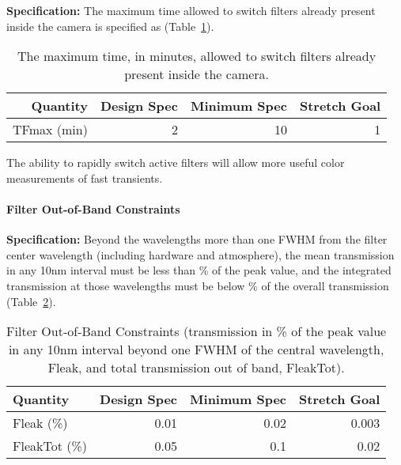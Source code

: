 \newpage
\textbf{Specification:} The maximum time allowed to switch filters already
present inside the camera is specified as
(Table~\ref{Tfilterswitch}).

\begin{table}[h]
\begin{tabular}{|r|r|r|r|}
\hline
     Quantity     & Design Spec & Minimum Spec  & Stretch Goal      \\
\hline
 TFmax (min)      &      2      &      10       &       1           \\
\hline
\end{tabular}
\caption{The maximum time, in minutes, allowed to switch filters already
present inside the camera.}
\label{Tfilterswitch}
\end{table}

The ability to rapidly switch active filters will allow more useful color
measurements of fast transients.


\paragraph{Filter Out-of-Band Constraints\\}

\textbf{Specification:} Beyond the wavelengths more than one FWHM from the filter
center wavelength (including hardware and atmosphere), the mean transmission
in any 10nm interval must be less than
\% of the peak value, and the integrated transmission at those wavelengths
must be below
\% of the overall transmission (Table~\ref{Tleaks}).

\begin{table}[h]
\begin{tabular}{|l|r|r|r|}
\hline
Quantity    & Design Spec & Minimum Spec & Stretch Goal        \\
\hline
 Fleak (\%)      &      0.01      &      0.02   &       0.003     \\
 FleakTot (\%)   &      0.05      &      0.1    &       0.02      \\
\hline
\end{tabular}
\caption{Filter Out-of-Band Constraints (transmission in \% of the peak
value in any 10nm interval beyond one FWHM of the central wavelength,
Fleak, and total transmission out of band, FleakTot).}
\label{Tleaks}
\end{table}

